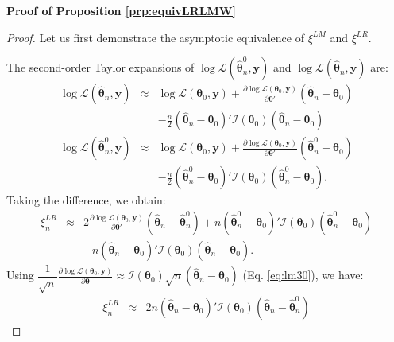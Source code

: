 \documentclass[
  12pt,
]{book}
\theoremstyle{definition}
\theoremstyle{definition}
\theoremstyle{definition}
\theoremstyle{definition}
\theoremstyle{remark}
\begin{document}
\textbf{Proof of Proposition \ref{prp:equivLRLMW}}

\begin{proof}
Let us first demonstrate the asymptotic equivalence of \(\xi^{LM}\) and \(\xi^{LR}\).

The second-order Taylor expansions of \(\log \mathcal{L}(\hat{\boldsymbol\theta}^0_n,\mathbf{y})\) and \(\log \mathcal{L}(\hat{\boldsymbol\theta}_n,\mathbf{y})\) are:
\begin{eqnarray*}
\log \mathcal{L}(\hat{\boldsymbol\theta}_n,\mathbf{y}) &\approx& \log \mathcal{L}(\boldsymbol\theta_0,\mathbf{y})
+ \frac{\partial \log \mathcal{L}(\boldsymbol\theta_0,\mathbf{y})}{\partial \boldsymbol\theta'}(\hat{\boldsymbol\theta}_n-\boldsymbol\theta_0) \\
&& - \frac{n}{2} (\hat{\boldsymbol\theta}_n-\boldsymbol\theta_0)' \mathcal{I}(\boldsymbol\theta_0) (\hat{\boldsymbol\theta}_n-\boldsymbol\theta_0)\\
\log \mathcal{L}(\hat{\boldsymbol\theta}^0_n,\mathbf{y}) &\approx& \log \mathcal{L}(\boldsymbol\theta_0,\mathbf{y})
+ \frac{\partial \log \mathcal{L}(\boldsymbol\theta_0,\mathbf{y})}{\partial \boldsymbol\theta'}(\hat{\boldsymbol\theta}^0_n-\boldsymbol\theta_0) \\
&& - \frac{n}{2} (\hat{\boldsymbol\theta}^0_n-\boldsymbol\theta_0)' \mathcal{I}(\boldsymbol\theta_0) (\hat{\boldsymbol\theta}^0_n-\boldsymbol\theta_0).
\end{eqnarray*}
Taking the difference, we obtain:
\begin{eqnarray*}
\xi_n^{LR} &\approx& 2\frac{\partial \log \mathcal{L}(\boldsymbol\theta_0,\mathbf{y})}{\partial \boldsymbol\theta'}
(\hat{\boldsymbol\theta}_n-\hat{\boldsymbol\theta}^0_n) + n (\hat{\boldsymbol\theta}^0_n-\boldsymbol\theta_0)' \mathcal{I}(\boldsymbol\theta_0) (\hat{\boldsymbol\theta}^0_n-\boldsymbol\theta_0)\\
&& - n (\hat{\boldsymbol\theta}_n-\boldsymbol\theta_0)' \mathcal{I}(\boldsymbol\theta_0) (\hat{\boldsymbol\theta}_n-\boldsymbol\theta_0).
\end{eqnarray*}
Using \(\dfrac{1}{\sqrt{n}}\frac{\partial \log \mathcal{L}(\boldsymbol\theta_0;\mathbf{y})}{\partial \boldsymbol\theta} \approx \mathcal{I}(\boldsymbol\theta_0)\sqrt{n}(\hat{\boldsymbol\theta}_n-\boldsymbol\theta_0)\) (Eq. \eqref{eq:lm30}), we have:
\begin{eqnarray*}
\xi_n^{LR} &\approx&
2n(\hat{\boldsymbol\theta}_n-\boldsymbol\theta_0)'\mathcal{I}(\boldsymbol\theta_0)
(\hat{\boldsymbol\theta}_n-\hat{\boldsymbol\theta}^0_n)

\end{eqnarray*}
\end{proof}
\end{document}
